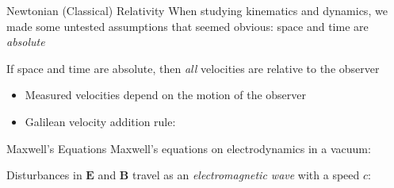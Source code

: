 \documentclass[12pt,compress,aspectratio=169]{beamer}
\begin{document}
\begin{frame}{Newtonian (Classical) Relativity}
  When studying kinematics and dynamics, we made some untested assumptions that
  seemed obvious: space and time are \emph{absolute}
  \vspace{.1in}If space and time are absolute, then \emph{all} velocities are
  relative to the observer
  \begin{itemize}
  \item Measured velocities depend on the motion of the observer
  \item Galilean velocity addition rule:

  \end{itemize}
\end{frame}


\begin{frame}{Maxwell's Equations}
  Maxwell's equations on electrodynamics in a vacuum:
  
  
  \vspace{-.1in}Disturbances in $\bm{E}$ and $\bm{B}$ travel as an
  \emph{electromagnetic wave} with a speed $c$:

\end{frame}
\end{document}
